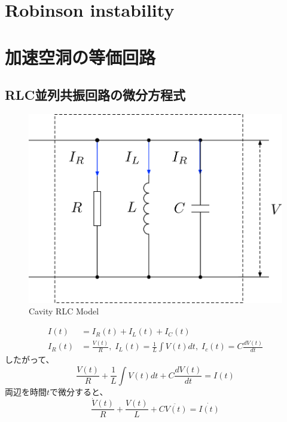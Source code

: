 \documentclass[book]{jlreq}
\begin{document}
\chapter{Robinson instability}

\appendix
\chapter{加速空洞の等価回路}
\section{RLC並列共振回路の微分方程式}
%
\begin{figure}[hbt]
    \begin{center}
        \includegraphics[width=12cm,clip]{figs/RLC_Model.pdf}
        \caption{Cavity RLC Model}
        \label{fig:RLC}
    \end{center}
\end{figure}
%
\begin{equation}
    \begin{split}
        I(t) &= I_R(t) + I_L(t) + I_C(t) \\
        I_R(t) &= \frac{V(t)}{R}, \; I_L(t) = \frac{1}{L}\int V(t) dt, \; I_c(t) = C\frac{dV(t)}{dt}
    \end{split}
\end{equation}
%
したがって、
%
\begin{equation}
    \frac{V(t)}{R} + \frac{1}{L}\int V(t) dt + C\frac{dV(t)}{dt} = I(t)
\end{equation}
%
両辺を時間$t$で微分すると、
%
\begin{equation}
    \frac{\dot{V}(t)}{R} + \frac{V(t)}{L}+ C \ddot{V(t)} = \dot{I(t)}
\end{equation}
\end{document}
